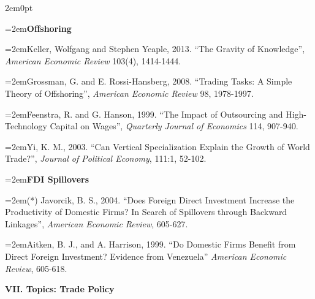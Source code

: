 \documentclass[10pt]{article}
\newcommand{\reading}{\par\hangindent=2em\hangafter=1\noindent}
\newenvironment{readingsblock}{%
  \begin{adjustwidth}{2em}{0pt} %
}{%
  \end{adjustwidth}
}
\begin{document}
\begin{readingsblock}
  \reading \textbf{Offshoring} \\[4pt]
  
  \reading Keller, Wolfgang and Stephen Yeaple, 2013. “The Gravity of Knowledge”, {\it American Economic Review} 103(4), 1414-1444.
  \reading Grossman, G. and E. Rossi-Hansberg, 2008. “Trading Tasks: A Simple Theory of Offshoring”, {\it American Economic Review} 98, 1978-1997.
  \reading Feenstra, R. and G. Hanson, 1999. “The Impact of Outsourcing and High-Technology Capital on Wages”, {\it Quarterly Journal of Economics} 114, 907-940.
  \reading Yi, K. M., 2003. “Can Vertical Specialization Explain the Growth of World Trade?”, {\it Journal of Political Economy}, 111:1, 52-102. \\[4pt]
  
  
  \reading \textbf{FDI Spillovers} \\[4pt]
  
  \reading (*) Javorcik, B. S., 2004. “Does Foreign Direct Investment Increase the Productivity of Domestic Firms? In Search of Spillovers through Backward Linkages”, {\it American Economic Review}, 605-627.
  \reading Aitken, B. J., and A. Harrison, 1999. “Do Domestic Firms Benefit from Direct Foreign Investment? Evidence from Venezuela” {\it American Economic Review}, 605-618. \\[4pt]
  
  \end{readingsblock}
  
  
  
\noindent \textbf{VII. Topics: Trade Policy} \\[6pt]
\end{document}
